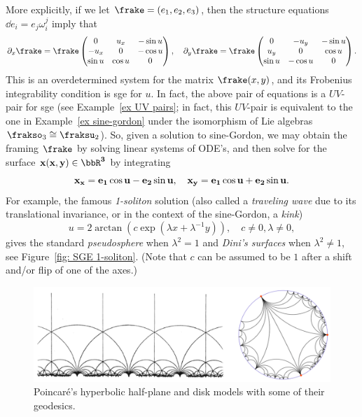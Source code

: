 More explicitly, if we let $\frake=(e_1,e_2,e_3)$, then the structure equations $\dd e_i=e_j\omega_i^j$ imply that 
\[\partial_x\frake=\frake \begin{pmatrix}
    0 & u_x & -\sin u\\
    -u_x & 0 & -\cos u\\
    \sin u& \cos u & 0
\end{pmatrix},\quad 
\partial_y\frake=\frake \begin{pmatrix}
    0 & -u_y & -\sin u\\
    u_y & 0 & \cos u\\
    \sin u& -\cos u & 0
\end{pmatrix}.\label{eq 7.21 Ivey}
\]
This is an overdetermined system for the matrix $\frake(x,y)$, and its Frobenius integrability condition is \gls{sge} for $u$. In fact, the above pair of equations is a $UV$-pair for \gls{sge} (see Example~\ref{ex UV pairs}; in fact, this $UV$-pair is equivalent to the one in Example~\ref{ex sine-gordon} under the isomorphism of Lie algebras $\frakso_3\cong\fraksu_2$). So, given a solution to sine-Gordon, we may obtain the framing $\frake$ by solving linear systems of ODE's, and then solve for the surface $\bf{x}(x,y)\in\bbR^3$ by integrating 
\[\bf{x}_x=e_1\cos u-e_2\sin u,\quad \bf{x}_y=e_1\cos u+e_2\sin u.\label{eq 7.22 Ivey}\]
For example, the famous \emph{1-soliton} solution (also called a \emph{traveling wave} due to its translational invariance, or in the context of the sine-Gordon, a \emph{kink})
\[u=2\arctan(c\exp(\lambda x+\lambda^{-1}y)),\quad c\neq 0, \lambda\neq 0,\label{eq SGE 1-soliton}\]
gives the standard \emph{pseudosphere} when $\lambda^2=1$ and \emph{Dini's surfaces} when $\lambda^2\neq 1$, see Figure~\ref{fig: SGE 1-soliton}. (Note that $c$ can be assumed to be $1$ after a shift and/or flip of one of the axes.)

\begin{figure}[tp]
    \centering 
    \includegraphics[scale=0.8]{figures/poincare.png}
    \caption{Poincar\'e's hyperbolic half-plane and disk models with some of their geodesics.}
    \label{fig:hyperbolic plane}
\end{figure}

